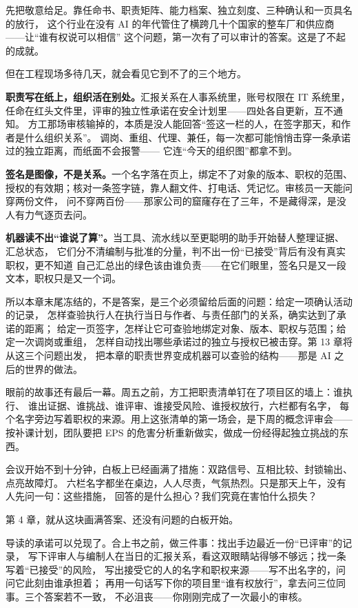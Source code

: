 先把敬意给足。靠任命书、职责矩阵、能力档案、独立刻度、三种确认和一页具名的放行，
这个行业在没有 AI 的年代管住了横跨几十个国家的整车厂和供应商——让“谁有权说可以相信”
这个问题，第一次有了可以审计的答案。这是了不起的成就。

但在工程现场多待几天，就会看见它到不了的三个地方。

\textbf{职责写在纸上，组织活在别处。}汇报关系在人事系统里，账号权限在 IT 系统里，
任命在红头文件里，评审的独立性承诺在安全计划里——四处各自更新，互不通知。
方工那场审核输掉的，本质是没人能回答“签这一栏的人，在签字那天，和作者是什么组织关系”。
调岗、重组、代理、兼任，每一次都可能悄悄击穿一条承诺过的独立距离，而纸面不会报警——
它连“今天的组织图”都拿不到。

\textbf{签名是图像，不是关系。}一个名字落在页上，绑定不了对象的版本、职权的范围、
授权的有效期；核对一条签字链，靠人翻文件、打电话、凭记忆。审核员一天能问穿两份文件，
问不穿两百份——那家公司的窟窿存在了三年，不是藏得深，是没人有力气逐页去问。

\textbf{机器读不出“谁说了算”。}当工具、流水线以至更聪明的助手开始替人整理证据、汇总状态，
它们分不清编制与批准的分量，判不出一份“已接受”背后有没有真实职权，更不知道
自己汇总出的绿色该由谁负责——在它们眼里，签名只是又一段文本，职权只是又一个词。

所以本章末尾冻结的，不是答案，是三个必须留给后面的问题：给定一项确认活动的记录，
怎样查验执行人在执行当日与作者、与责任部门的关系，确实达到了承诺的距离；
给定一页签字，怎样让它可查验地绑定对象、版本、职权与范围；给定一次调岗或重组，
怎样自动找出哪些承诺过的独立与授权已被击穿。第 13 章将从这三个问题出发，
把本章的职责世界变成机器可以查验的结构——那是 AI 之后的世界的做法。

眼前的故事还有最后一幕。周五之前，方工把职责清单钉在了项目区的墙上：谁执行、
谁出证据、谁挑战、谁评审、谁接受风险、谁授权放行，六栏都有名字，
每个名字旁边写着职权的来源。用上这张清单的第一场会，是下周的概念评审会——
按补课计划，团队要把 EPS 的危害分析重新做实，做成一份经得起独立挑战的东西。

会议开始不到十分钟，白板上已经画满了措施：双路信号、互相比较、封锁输出、点亮故障灯。
六栏名字都坐在桌边，人人尽责，气氛热烈。只是那天上午，没有人先问一句：这些措施，
回答的是什么担心？我们究竟在害怕什么损失？

第 4 章，就从这块画满答案、还没有问题的白板开始。

导读的承诺可以兑现了。合上书之前，做三件事：找出手边最近一份“已评审”的记录，
写下评审人与编制人在当日的汇报关系，看这双眼睛站得够不够远；找一条写着“已接受”的风险，
写出接受它的人的名字和职权来源——写不出名字的，问问它此刻由谁承担着；
再用一句话写下你的项目里“谁有权放行”，拿去问三位同事。三个答案若不一致，
不必沮丧——你刚刚完成了一次最小的审核。

